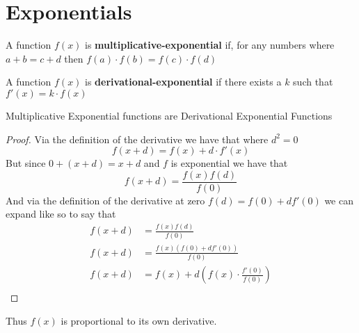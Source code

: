 \chapter{Exponentials \chili \chili}
\begin{definition}
  A function $f(x)$ is \textbf{multiplicative-exponential} if, for any numbers where $a+b=c+d$ then $f(a) \cdot f(b)=f(c)\cdot f(d)$
\end{definition}
\begin{definition}
  A function $f(x)$ is \textbf{derivational-exponential} if there exists a $k$ such that $f'(x)=k\cdot f(x)$
\end{definition}
\begin{theorem}
  Multiplicative Exponential functions are Derivational Exponential Functions
\end{theorem}
\begin{proof}
  Via the definition of the derivative we have that where $d^2=0$
  \begin{equation*}
    f(x+d)=f(x)+d\cdot f'(x)
  \end{equation*}
  But since $0+(x+d)=x+d$ and $f$ is exponential we have that
  \begin{equation*}
    f(x+d)=\frac{f(x)f(d)}{f(0)}
  \end{equation*}
  And via the definition of the derivative at zero $f(d)=f(0)+d f'(0)$ we can expand like so to say that
  \begin{align*}
    f(x+d)&=\frac{f(x)f(d)}{f(0)}\\
    f(x+d)&=\frac{f(x)(f(0)+d f'(0))}{f(0)}\\
    f(x+d)&=f(x)+d\left( f(x)\cdot\frac{f'(0)}{f(0)}\right)\\
  \end{align*}
\end{proof}
Thus $f(x)$ is proportional to its own derivative.


